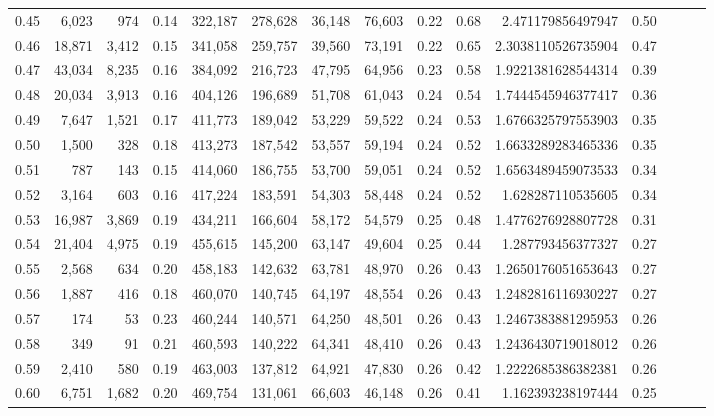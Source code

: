 \begin{tabular}{rrrrrrrrrrrrrrr}
0.45 &   6,023 &     974 &  0.14 &  322,187 &  278,628 &   36,148 &   76,603 &  0.22 &  0.68 &    2.471179856497947 &      0.50 \\
0.46 &  18,871 &   3,412 &  0.15 &  341,058 &  259,757 &   39,560 &   73,191 &  0.22 &  0.65 &   2.3038110526735904 &      0.47 \\
0.47 &  43,034 &   8,235 &  0.16 &  384,092 &  216,723 &   47,795 &   64,956 &  0.23 &  0.58 &   1.9221381628544314 &      0.39 \\
0.48 &  20,034 &   3,913 &  0.16 &  404,126 &  196,689 &   51,708 &   61,043 &  0.24 &  0.54 &   1.7444545946377417 &      0.36 \\
0.49 &   7,647 &   1,521 &  0.17 &  411,773 &  189,042 &   53,229 &   59,522 &  0.24 &  0.53 &   1.6766325797553903 &      0.35 \\
0.50 &   1,500 &     328 &  0.18 &  413,273 &  187,542 &   53,557 &   59,194 &  0.24 &  0.52 &   1.6633289283465336 &      0.35 \\
0.51 &     787 &     143 &  0.15 &  414,060 &  186,755 &   53,700 &   59,051 &  0.24 &  0.52 &   1.6563489459073533 &      0.34 \\
0.52 &   3,164 &     603 &  0.16 &  417,224 &  183,591 &   54,303 &   58,448 &  0.24 &  0.52 &    1.628287110535605 &      0.34 \\
0.53 &  16,987 &   3,869 &  0.19 &  434,211 &  166,604 &   58,172 &   54,579 &  0.25 &  0.48 &   1.4776276928807728 &      0.31 \\
0.54 &  21,404 &   4,975 &  0.19 &  455,615 &  145,200 &   63,147 &   49,604 &  0.25 &  0.44 &    1.287793456377327 &      0.27 \\
0.55 &   2,568 &     634 &  0.20 &  458,183 &  142,632 &   63,781 &   48,970 &  0.26 &  0.43 &   1.2650176051653643 &      0.27 \\
0.56 &   1,887 &     416 &  0.18 &  460,070 &  140,745 &   64,197 &   48,554 &  0.26 &  0.43 &   1.2482816116930227 &      0.27 \\
0.57 &     174 &      53 &  0.23 &  460,244 &  140,571 &   64,250 &   48,501 &  0.26 &  0.43 &   1.2467383881295953 &      0.26 \\
0.58 &     349 &      91 &  0.21 &  460,593 &  140,222 &   64,341 &   48,410 &  0.26 &  0.43 &   1.2436430719018012 &      0.26 \\
0.59 &   2,410 &     580 &  0.19 &  463,003 &  137,812 &   64,921 &   47,830 &  0.26 &  0.42 &   1.2222685386382381 &      0.26 \\
0.60 &   6,751 &   1,682 &  0.20 &  469,754 &  131,061 &   66,603 &   46,148 &  0.26 &  0.41 &    1.162393238197444 &      0.25 \\

\end{tabular}
